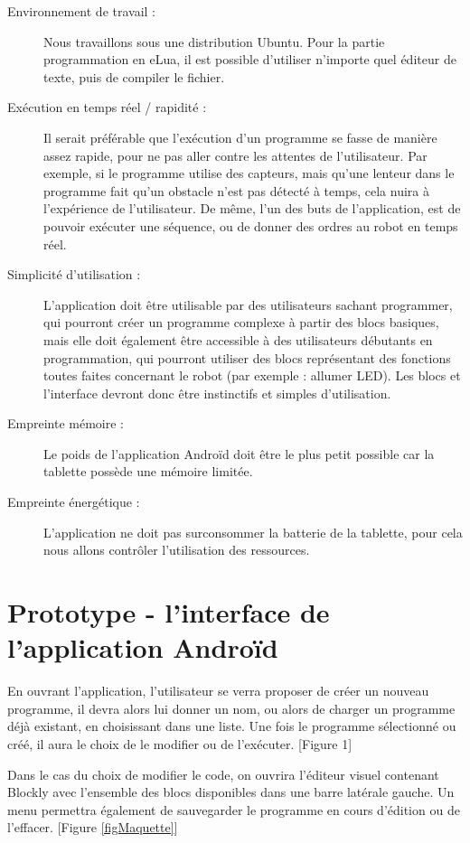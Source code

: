 \documentclass[12pt,francais]{report}
\begin{document}
\begin{description}
	\item [Environnement de travail :]Nous travaillons sous une distribution Ubuntu. Pour la partie programmation en eLua, il est possible d'utiliser n'importe quel éditeur de texte, puis de compiler le fichier.
	\item [Exécution en temps réel / rapidité :] Il serait préférable que l'exécution d'un programme se fasse de manière assez rapide, pour ne pas aller contre les attentes de l'utilisateur. Par exemple, si le programme utilise des capteurs, mais qu'une lenteur dans le programme fait qu'un obstacle n'est pas détecté à temps, cela nuira à l'expérience de l'utilisateur. De même, l'un des buts de l'application, est de pouvoir exécuter une séquence, ou de donner des ordres au robot en temps réel. 
	\item [Simplicité d'utilisation : ]L'application doit être utilisable par des utilisateurs sachant programmer, qui pourront créer un programme complexe à partir des blocs basiques, mais elle doit également être accessible à des utilisateurs débutants en programmation, qui pourront utiliser des blocs représentant des fonctions toutes faites concernant le robot (par exemple : allumer LED). Les blocs et l'interface devront donc être instinctifs et simples d'utilisation.
	\item [Empreinte mémoire :] Le poids de l'application Androïd doit être le plus petit possible car la tablette possède une mémoire limitée.
	\item [Empreinte énergétique :] L'application ne doit pas surconsommer la batterie de la tablette, pour cela nous allons contrôler l'utilisation des ressources.
\end{description}

\section*{Prototype - l'interface de l'application Androïd }
En ouvrant l'application, l'utilisateur se verra proposer de créer un nouveau programme, il devra alors lui donner un nom, ou alors de charger un programme déjà existant, en choisissant dans une liste. Une fois le programme sélectionné ou créé, il aura le choix de le modifier ou de l'exécuter. [Figure 1]

Dans le cas du choix de modifier le code, on ouvrira l'éditeur visuel contenant Blockly avec l'ensemble des blocs disponibles dans une barre latérale gauche. Un menu permettra également de sauvegarder le programme en cours d'édition ou de l'effacer. [Figure \ref{figMaquette}]\\
\end{document}
